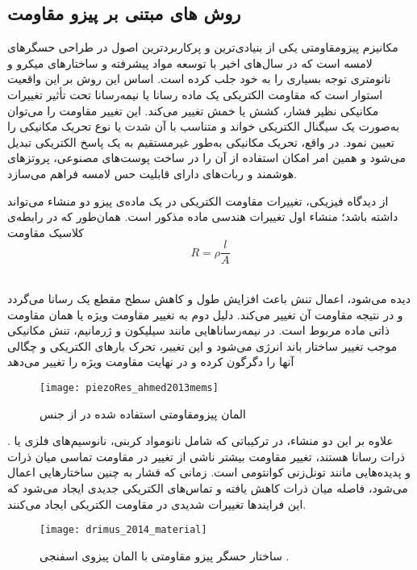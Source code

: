 \subsection{روش های مبتنی بر پیزو مقاومت}
مکانیزم پیزومقاومتی یکی از بنیادی‌ترین و پرکاربردترین اصول در طراحی حسگرهای لامسه است که در سال‌های اخیر با توسعه مواد پیشرفته و ساختارهای میکرو و نانومتری توجه بسیاری را به خود جلب کرده است. اساس این روش بر این واقعیت استوار است که مقاومت الکتریکی یک ماده رسانا یا نیمه‌رسانا تحت تأثیر تغییرات مکانیکی نظیر فشار، کشش یا خمش تغییر می‌کند. این تغییر مقاومت را می‌توان به‌صورت یک سیگنال الکتریکی خواند و متناسب با آن شدت یا نوع تحریک مکانیکی را تعیین نمود. در واقع، تحریک مکانیکی به‌طور غیرمستقیم به یک پاسخ الکتریکی تبدیل می‌شود و همین امر امکان استفاده از آن را در ساخت پوست‌های مصنوعی، پروتزهای هوشمند و ربات‌های دارای قابلیت حس لامسه فراهم می‌سازد.

از دیدگاه فیزیکی، تغییرات مقاومت الکتریکی در یک ماده‌ی پیزو دو منشاء می‌تواند داشته باشد؛ منشاء اول تغییرات هندسی ماده مذکور است. همان‌طور که در رابطه‌ی کلاسیک مقاومت 
\begin{equation}\label{eq:piezoRes1}
	R=\rho\frac{l}{A}
\end{equation}
​

دیده می‌شود، اعمال تنش باعث افزایش طول و کاهش سطح مقطع یک رسانا می‌گردد و در نتیجه مقاومت آن تغییر می‌کند. دلیل دوم به تغییر مقاومت ویژه یا همان مقاومت ذاتی ماده مربوط است. در نیمه‌رساناهایی مانند سیلیکون و ژرمانیم، تنش مکانیکی موجب تغییر ساختار باند انرژی می‌شود و این تغییر، تحرک بارهای الکتریکی و چگالی آنها را دگرگون کرده و در نهایت مقاومت ویژه را تغییر می‌دهد
\begin{figure}[ht]
	\centering
	\texttt{[image: piezoRes\_ahmed2013mems]}
	\caption{المان پیزومقاومتی استفاده شده در
		\cite{ahmed2013piezores}
		از جنس
		}
		\label{fig:ahmed_piezores}
	\end{figure}
	. علاوه بر این دو منشاء، در ترکیباتی که شامل نانومواد کربنی، نانوسیم‌های فلزی یا ذرات رسانا هستند، تغییر مقاومت بیشتر ناشی از تغییر در مقاومت تماسی میان ذرات و پدیده‌هایی مانند تونل‌زنی کوانتومی
	است. زمانی که فشار به چنین ساختارهایی اعمال می‌شود، فاصله میان ذرات کاهش یافته و تماس‌های الکتریکی جدیدی ایجاد می‌شود که این فرایندها تغییرات شدیدی در مقاومت الکتریکی ایجاد می‌کنند.
	\cite{xi2024mechanisms}
	\begin{figure}[t]
		\centering
		\texttt{[image: drimus\_2014\_material]}
		\caption{ساختار حسگر پیزو مقاومتی با المان پیزوی اسفنجی
			\cite{drimus2014piezores}.}
		\label{fig:piezoResStructure}
	\end{figure}
	
